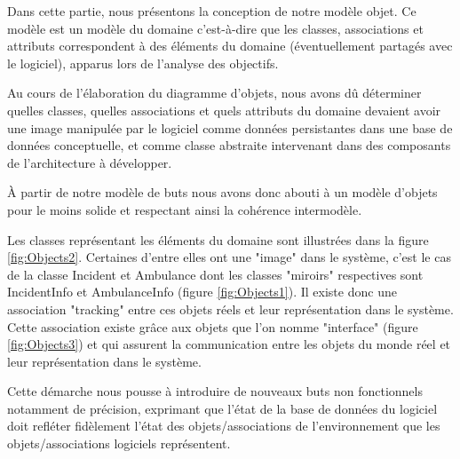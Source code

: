 Dans cette partie, nous présentons la conception de notre modèle objet. Ce
modèle est un modèle du domaine c'est-à-dire que les classes, associations
et attributs correspondent à des éléments du domaine (éventuellement
partagés avec le logiciel), apparus lors de l'analyse des objectifs. 

Au cours de l'élaboration du diagramme d'objets, nous avons dû déterminer
quelles classes, quelles associations et quels attributs du domaine devaient avoir une
image manipulée par le logiciel comme données persistantes dans une base de
données conceptuelle, et comme classe abstraite intervenant dans des
composants de l'architecture à développer. 

À partir de notre modèle de buts nous avons donc abouti à un modèle d'objets
pour le moins solide et respectant ainsi la cohérence intermodèle. 

Les classes représentant les éléments du domaine sont illustrées dans la
figure \ref{fig:Objects2}. Certaines d'entre elles ont une "image" dans le système, c'est
le cas de la classe Incident et Ambulance dont les classes "miroirs"
respectives sont IncidentInfo et AmbulanceInfo (figure  \ref{fig:Objects1}). Il existe donc
une association "tracking" entre ces objets réels et leur représentation
dans le système. Cette association existe grâce aux objets que l'on nomme
"interface" (figure  \ref{fig:Objects3}) et qui assurent la communication entre les objets du
monde réel et leur représentation dans le système. 

Cette démarche nous pousse à introduire de nouveaux buts non fonctionnels
notamment de précision, exprimant que l'état de la base de données du
logiciel doit refléter fidèlement l'état des objets/associations de
l'environnement que les objets/associations logiciels représentent. 

